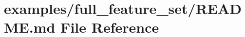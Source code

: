 \hypertarget{examples_2full__feature__set_2_r_e_a_d_m_e_8md}{}\section{examples/full\+\_\+feature\+\_\+set/\+R\+E\+A\+D\+ME.md File Reference}
\label{examples_2full__feature__set_2_r_e_a_d_m_e_8md}
